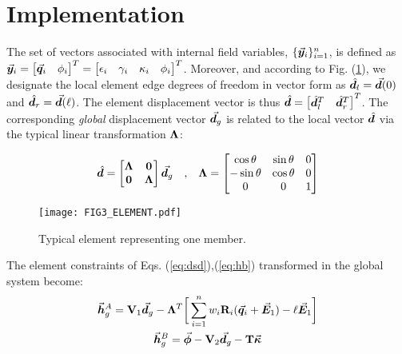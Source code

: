 \section{Implementation}\label{section:CH2-S4}

The set of vectors associated with internal field variables,
$\{\vec{\boldsymbol{y}}_i\}_{i=1}^n$, is defined as $\vec{\boldsymbol{y}}_i =\begin{bmatrix}
	\vec{\boldsymbol{q}}_i & \phi_i
\end{bmatrix}^T= \begin{bmatrix}
	\epsilon_i & \gamma_i & \kappa_i & \phi_i
\end{bmatrix}^T$. Moreover, and according to Fig. (\ref{fig:fig3}), we designate
the local element edge degrees of freedom in vector form as
$\hat{\boldsymbol{d}}_l = \vec{\boldsymbol{d}}(0)$ and $\hat{\boldsymbol{d}}_r = \vec{\boldsymbol{d}}(\ell)$. The element 
displacement
vector is thus $\hat{\boldsymbol{d}} = \begin{bmatrix} \hat{\boldsymbol{d}}_l^T & \hat{\boldsymbol{d}}_r^T 
\end{bmatrix}^T$. The corresponding
\emph{global} displacement vector $\vec{\boldsymbol{d}}_g$ is related to the local vector
$\hat{\boldsymbol{d}}$ via the typical linear transformation $\mathbf{\Lambda}$:  %

\begin{gather}
	\hat{\boldsymbol{d}} = \begin{bmatrix}
		\mathbf{\Lambda} & \mathbf{0}\\
		\mathbf{0} & \mathbf{\Lambda}
	\end{bmatrix}\vec{\boldsymbol{d}}_g
	\quad\text{,}\quad \mathbf{\Lambda}=\begin{bmatrix}
		\cos\theta & \sin\theta & 0\\
		-\sin\theta & \cos\theta & 0\\
		0 & 0 & 1
	\end{bmatrix}
\end{gather}

\begin{figure}[b]
	\centering
	\texttt{[image: FIG3\_ELEMENT.pdf]}
	\caption{Typical element representing one member.}
	\label{fig:fig3}
\end{figure}

\noindent The element constraints of Eqs. (\ref{eq:dsd}),(\ref{eq:hb})
transformed in the global system become:  %
\begin{subequations}
	\begin{gather}
		\vec{\boldsymbol{h}}^A_g = \mathbf{V}_1\vec{\boldsymbol{d}}_g - \mathbf{\Lambda}^T\bigg[\sum_{i=1}^n
		w_i\mathbf{R}_i(\vec{\boldsymbol{q}}_i+\vec{\boldsymbol{E}}_1) - \ell\vec{\boldsymbol{E}}_1\bigg]
		\label{eq:impsd1}\\
		\vec{\boldsymbol{h}}^B_g = \vec{\boldsymbol{\phi}}-\mathbf{V}_2\vec{\boldsymbol{d}}_g - \mathbf{T}\vec{\boldsymbol{\kappa}}
		\label{eq:impsd2}
	\end{gather}
\end{subequations}

